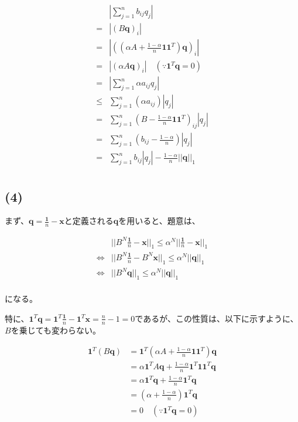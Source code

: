 \documentclass[a4paper, 10pt, dvipdfmx]{jlreq}
\begin{document}
\begin{align*}
         & \left|\sum_{j=1}^nb_{ij}q_j\right|                                            \\
    =    & |(B\bm{q})_i|                                                                 \\
    =    & \left|\left((\alpha A+\frac{1-\alpha}{n}\bm{1}\bm{1}^T)\bm{q}\right)_i\right| \\
    =    & \left|(\alpha A\bm{q})_i\right| \quad (\because \bm{1}^T\bm{q}=0)             \\
    =    & \left|\sum_{j=1}^n\alpha a_{ij}q_j\right|                                     \\
    \leq & \sum_{j=1}^n(\alpha a_{ij})|q_j|                                              \\
    =    & \sum_{j=1}^n \left(B-\frac{1-\alpha}{n}\bm{1}\bm{1}^T\right)_{ij}|q_j|        \\
    =    & \sum_{j=1}^n \left(b_{ij}-\frac{1-\alpha}{n}\right)|q_j|                      \\
    =    & \sum_{j=1}^n b_{ij}|q_j|-\frac{1-\alpha}{n}||\bm{q}||_1                       \\
\end{align*}

\subsection*{(4)}

まず、$\bm{q}=\frac{\bm{1}}{n}-\bm{x}$と定義される$\bm{q}$を用いると、題意は、

\begin{align*}
                    & ||B^N\frac{\bm{1}}{n}-\bm{x}||_1 \leq \alpha^N ||\frac{\bm{1}}{n}-\bm{x}||_1 \\
    \Leftrightarrow & ||B^N\frac{\bm{1}}{n}-B^N\bm{x}||_1 \leq \alpha^N ||\bm{q}||_1               \\
    \Leftrightarrow & ||B^N\bm{q}||_1 \leq \alpha^N ||\bm{q}||_1                                   \\
\end{align*}

になる。

特に、$\bm{1}^T\bm{q}=\bm{1}^T\frac{\bm{1}}{n}-\bm{1}^T\bm{x}=\frac{n}{n}-1=0$であるが、この性質は、以下に示すように、$B$を乗じても変わらない。

\begin{align*}
    \bm{1}^T(B\bm{q}) & =\bm{1}^T \left(\alpha A+\frac{1-\alpha}{n}\bm{1}\bm{1}^T\right)\bm{q} \\
                      & =\alpha \bm{1}^TA\bm{q}+\frac{1-\alpha}{n}\bm{1}^T\bm{1}\bm{1}^T\bm{q} \\
                      & =\alpha \bm{1}^T\bm{q}+\frac{1-\alpha}{n}\bm{1}^T\bm{q}                \\
                      & =\left(\alpha+\frac{1-\alpha}{n}\right)\bm{1}^T\bm{q}                  \\
                      & =0 \quad (\because \bm{1}^T\bm{q}=0)
\end{align*}
\end{document}
